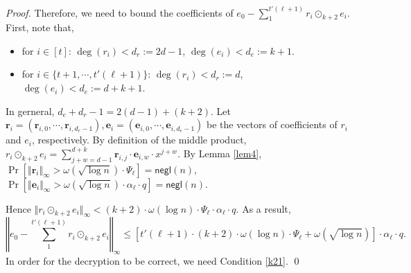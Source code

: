 \documentclass[runningheads]{llncs}
\begin{document}
\begin{proof}
Therefore, we need to bound the coefficients of $e_0-\sum_{1}^{t'(\ell+1)}r_i\odot_{k+2} e_i$. First, note that, 
\begin{itemize}
\item for $i \in [t]$: $\deg(r_i)< d_r:=2d-1$, $\deg(e_i)<d_e:=k+1$. 
\item for $i \in \{ t+1, \cdots, t'(\ell+1)\}$: $\deg(r_i)< d_r:=d$, $\deg(e_i)<d_e:=d+k+1$.
\end{itemize}
In gerneral, $d_e+d_r-1=2(d-1)+(k+2)$. Let $\textbf{r}_i=(\textbf{r}_{i,0}, \cdots, \textbf{r}_{i,d_r-1}), \textbf{e}_i=(\textbf{e}_{i,0}, \cdots, \textbf{e}_{i,d_e-1})$ be the vectors of coefficients of $r_i$ and $e_i$, respectively. By definition of the middle product,
$r_i\odot_{k+2} e_i= \sum_{j+w=d-1}^{d+k}\textbf{r}_{i,j}\cdot \textbf{e}_{i,w}\cdot x^{j+w}.$
By Lemma \ref{lem4},
$\Pr[\Vert \textbf{r}_i\Vert_{\infty} > \omega(\sqrt{\log n})\cdot \Psi_\ell ]=\textsf{negl}(n), $
$\Pr[\Vert \textbf{e}_i\Vert_{\infty}> \omega(\sqrt{\log n})\cdot \alpha_{\ell}\cdot q]=\textsf{negl}(n). $

Hence $\Vert r_i\odot_{k+2} e_i\Vert_{\infty} <(k+2)\cdot \omega(\log n)\cdot \Psi_\ell \cdot \alpha_{\ell}\cdot q.$
 As a result, 
$$\left\Vert e_0-\sum_{1}^{t'(\ell+1)}r_i\odot_{k+2} e_i\right \Vert_{\infty}\leq [t'(\ell+1)\cdot(k+2)\cdot \omega(\log n)\cdot \Psi_\ell  +\omega(\sqrt{\log n})]\cdot \alpha_{\ell}\cdot q.$$
In order for the decryption to be correct, we need Condition \eqref{k21}.
\qed
\end{proof}
\end{document}
